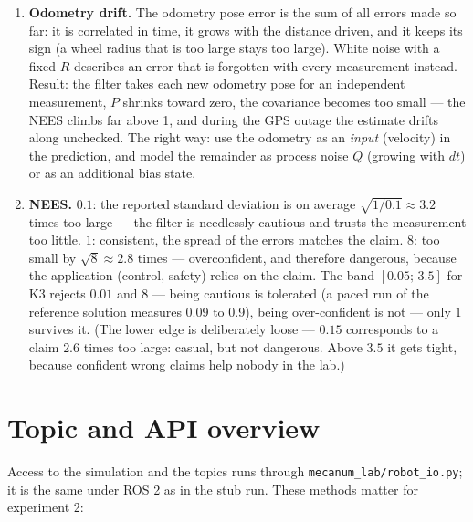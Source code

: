 \documentclass[12pt,a4paper]{scrartcl}
\newcommand{\ordner}[1]{\texttt{#1}}
\begin{document}
\begin{enumerate}
  \item \textbf{Odometry drift.} The odometry pose error is the sum of all errors made
        so far: it is correlated in time, it grows with the distance driven, and it keeps
        its sign (a wheel radius that is too large stays too large). White noise with a
        fixed \(R\) describes an error that is forgotten with every measurement instead.
        Result: the filter takes each new odometry pose for an independent measurement,
        \(P\) shrinks toward zero, the covariance becomes too small — the NEES climbs far
        above 1, and during the GPS outage the estimate drifts along unchecked. The right
        way: use the odometry as an \emph{input} (velocity) in the prediction, and model
        the remainder as process noise \(Q\) (growing with \(dt\)) or as an additional
        bias state.
  \item \textbf{NEES.} \(0.1\): the reported standard deviation is on average
        \(\sqrt{1/0.1}\approx3.2\) times too large — the filter is needlessly cautious and
        trusts the measurement too little. \(1\): consistent, the spread of the errors matches
        the claim. \(8\): too small by \(\sqrt{8}\approx2.8\) times — overconfident, and
        therefore dangerous, because the application (control, safety) relies on the claim.
        The band \([0.05;\,3.5]\) for K3 rejects \(0.01\) and \(8\) — being cautious is
        tolerated (a paced run of the reference solution measures 0.09 to 0.9), being
        over-confident is not — only \(1\)
        survives it. (The lower edge is deliberately loose — \(0.15\) corresponds to a claim
        \(2.6\) times too large: casual, but not dangerous. Above \(3.5\) it gets tight,
        because confident wrong claims help nobody in the lab.)
\end{enumerate}

\section{Topic and API overview}\label{sec:api}
Access to the simulation and the topics runs through \ordner{mecanum\_lab/robot\_io.py}; it is
the same under ROS 2 as in the stub run. These methods matter for experiment 2:
\end{document}
